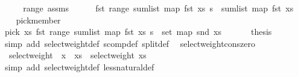 \begin{isabellebody}
%
\isadelimproof
%
\endisadelimproof
%
\isatagproof
{}\isamarkupfalse%
\ {\isacharminus}{\kern0pt}\isanewline
\ \ \isamarkupfalse%
\ range\ assms\isanewline
\ \ \ \ \isamarkupfalse%
\ {\isachardoublequoteopen}fst\ {\isacharparenleft}{\kern0pt}range\ {\isacharparenleft}{\kern0pt}sum{\isacharunderscore}{\kern0pt}list\ {\isacharparenleft}{\kern0pt}map\ fst\ xs{\isacharparenright}{\kern0pt}{\isacharparenright}{\kern0pt}\ s{\isacharparenright}{\kern0pt}\ {\isacharless}{\kern0pt}\ sum{\isacharunderscore}{\kern0pt}list\ {\isacharparenleft}{\kern0pt}map\ fst\ xs{\isacharparenright}{\kern0pt}{\isachardoublequoteclose}\ \isacommand{{\isachardot}{\kern0pt}}\isamarkupfalse%
\isanewline
\ \ \isamarkupfalse%
\ pick{\isacharunderscore}{\kern0pt}member\isanewline
\ \ \ \ \isamarkupfalse%
\ {\isachardoublequoteopen}pick\ xs\ {\isacharparenleft}{\kern0pt}fst\ {\isacharparenleft}{\kern0pt}range\ {\isacharparenleft}{\kern0pt}sum{\isacharunderscore}{\kern0pt}list\ {\isacharparenleft}{\kern0pt}map\ fst\ xs{\isacharparenright}{\kern0pt}{\isacharparenright}{\kern0pt}\ s{\isacharparenright}{\kern0pt}{\isacharparenright}{\kern0pt}\ {\isasymin}\ set\ {\isacharparenleft}{\kern0pt}map\ snd\ xs{\isacharparenright}{\kern0pt}{\isachardoublequoteclose}\ \isacommand{{\isachardot}{\kern0pt}}\isamarkupfalse%
\isanewline
\ \ \isamarkupfalse%
\ \isamarkupfalse%
\ {\isacharquery}{\kern0pt}thesis\ \isamarkupfalse%
\ {\isacharparenleft}{\kern0pt}simp\ add{\isacharcolon}{\kern0pt}\ select{\isacharunderscore}{\kern0pt}weight{\isacharunderscore}{\kern0pt}def\ scomp{\isacharunderscore}{\kern0pt}def\ split{\isacharunderscore}{\kern0pt}def{\isacharparenright}{\kern0pt}\ \isanewline
{}\isamarkupfalse%
%
\endisatagproof
{\isafoldproof}%
%
\isadelimproof
\isanewline
%
\endisadelimproof
\isanewline
{}\isamarkupfalse%
\ select{\isacharunderscore}{\kern0pt}weight{\isacharunderscore}{\kern0pt}cons{\isacharunderscore}{\kern0pt}zero{\isacharcolon}{\kern0pt}\isanewline
\ \ {\isachardoublequoteopen}select{\isacharunderscore}{\kern0pt}weight\ {\isacharparenleft}{\kern0pt}{\isacharparenleft}{\kern0pt}{}{\isacharcomma}{\kern0pt}\ x{\isacharparenright}{\kern0pt}\ {\isacharhash}{\kern0pt}\ xs{\isacharparenright}{\kern0pt}\ {\isacharequal}{\kern0pt}\ select{\isacharunderscore}{\kern0pt}weight\ xs{\isachardoublequoteclose}\isanewline
%
\isadelimproof
\ \ %
\endisadelimproof
%
\isatagproof
{}\isamarkupfalse%
\ {\isacharparenleft}{\kern0pt}simp\ add{\isacharcolon}{\kern0pt}\ select{\isacharunderscore}{\kern0pt}weight{\isacharunderscore}{\kern0pt}def\ less{\isacharunderscore}{\kern0pt}natural{\isacharunderscore}{\kern0pt}def{\isacharparenright}{\kern0pt}%

\end{isabellebody}
